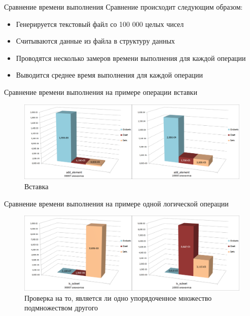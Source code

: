 \documentclass{beamer}
\begin{document}
	\begin{frame}{Сравнение времени выполнения}
		Сравнение происходит следующим образом:
		\begin{itemize}
			\item Генерируется текстовый файл со 100 000 целых чисел
			\item Считываются данные из файла в структуру данных
			\item Проводятся несколько замеров времени выполнения для каждой операции
			\item Выводится среднее время выполнения для каждой операции
		\end{itemize}
	\end{frame}
	
	\begin{frame}{Сравнение времени выполнения на примере операции вставки}
		\begin{figure}
			\includegraphics[scale=0.18]{img/histograms/add_element.png}
			\caption{Вставка}
		\end{figure}
	\end{frame}
	
	
	\begin{frame}{Сравнение времени выполнения на примере одной логической операции}				
		\begin{figure}
			\includegraphics[scale=0.18]{img/histograms/is_subset.png}
			\caption{Проверка на то, является ли одно упорядоченное множество подмножеством другого}
		\end{figure}
	\end{frame}
	
\end{document}
